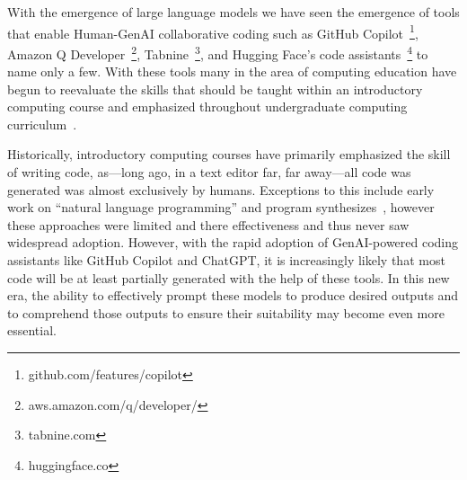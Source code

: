 With the emergence of large language models we have seen the emergence of tools
that enable Human-GenAI collaborative coding such as GitHub
Copilot~\footnote{github.com/features/copilot}, Amazon Q
Developer~\footnote{aws.amazon.com/q/developer/},
Tabnine~\footnote{tabnine.com}, and Hugging Face's code
assistants~\footnote{huggingface.co} to name only a few. With these tools many
in the area of computing education have begun to reevaluate the skills that
should be taught within an introductory computing course and emphasized
throughout undergraduate computing curriculum~\cite{prather_beyond_2024}.

Historically, introductory computing courses have primarily emphasized the skill
of writing code, as—long ago, in a text editor far, far away—all code was
generated was almost exclusively by humans. Exceptions to this include early
work on ``natural language programming'' and program synthesizes~\cite{},
however these approaches were limited and there effectiveness and thus never saw
widespread adoption.
However, with the rapid adoption of
GenAI-powered coding assistants like GitHub Copilot and ChatGPT, it is
increasingly likely that most code will be at least partially generated with the
help of these tools. In this new era, the ability to effectively prompt these
models to produce desired outputs and to comprehend those outputs to ensure
their suitability may become even more essential.



